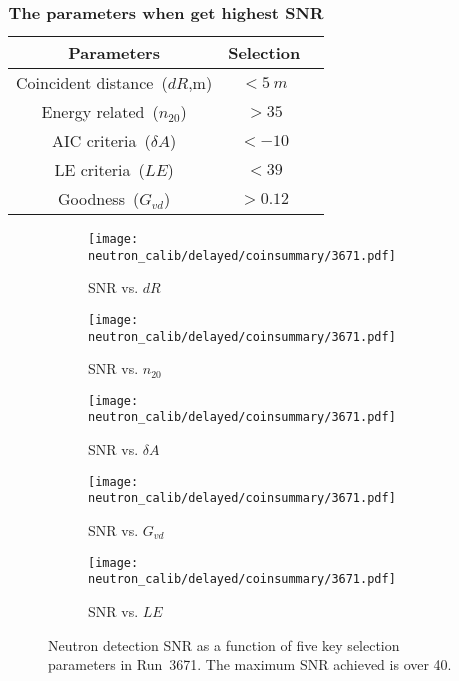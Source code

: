 \begin{table}[htbp]
	\caption{\textbf{The parameters when get highest SNR}}%
	\label{tab:param-scan-snr}
	\centering%
	\begin{tabular}{ccc}
		\toprule%
		Parameters                   & Selection    \\
		\midrule%
		Coincident distance~($dR$,m) & $<\SI{5}{m}$ \\
		Energy related~($n_{20}$)    & $>35$        \\
		AIC criteria~($\delta A$)    & $<-10$       \\
		LE criteria~($LE$)           & $<39$        \\
		Goodness~($G_{vd}$)          & $>0.12$      \\
		\bottomrule
	\end{tabular}
\end{table}

\begin{figure}[htbp]
	\centering
	\begin{subfigure}{0.5\textwidth}
		\centering
		\texttt{[image: neutron\_calib/delayed/coinsummary/3671.pdf]}
		\caption{SNR vs. $dR$}
		\label{fig:snrdR}
	\end{subfigure}%
	\begin{subfigure}{0.5\textwidth}
		\centering
		\texttt{[image: neutron\_calib/delayed/coinsummary/3671.pdf]}
		\caption{SNR vs. $n_{20}$}
		\label{fig:snrn20}
	\end{subfigure}
	\begin{subfigure}{0.5\textwidth}
		\centering
		\texttt{[image: neutron\_calib/delayed/coinsummary/3671.pdf]}
		\caption{SNR vs. $\delta A$}
		\label{fig:snrdA}
	\end{subfigure}%
	\begin{subfigure}{0.5\textwidth}
		\centering
		\texttt{[image: neutron\_calib/delayed/coinsummary/3671.pdf]}
		\caption{SNR vs. $G_{vd}$}
		\label{fig:snrGvd}
	\end{subfigure}
	\begin{subfigure}{0.5\textwidth}
		\centering
		\texttt{[image: neutron\_calib/delayed/coinsummary/3671.pdf]}
		\caption{SNR vs. $LE$}
		\label{fig:snrLE}
	\end{subfigure}
	\caption{Neutron detection SNR as a function of five key selection parameters in Run~3671. The maximum SNR achieved is over 40.}
	\label{fig:High-snr}
\end{figure}


